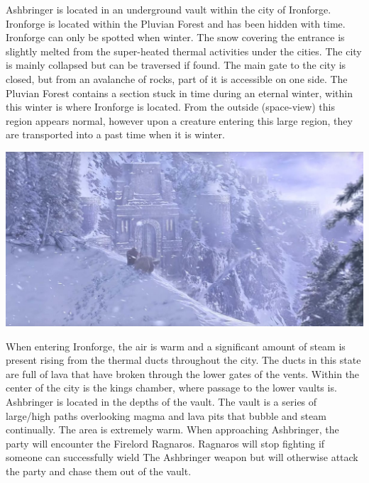 Ashbringer is located in an underground vault within the city of Ironforge. Ironforge is located within the Pluvian Forest and has been hidden with time. Ironforge can only be spotted when winter. The snow covering the entrance is slightly melted from the super-heated thermal activities under the cities. The city is mainly collapsed but can be traversed if found. The main gate to the city is closed, but from an avalanche of rocks, part of it is accessible on one side. The Pluvian Forest contains a section stuck in time during an eternal winter, within this winter is where Ironforge is located. From the outside (space-view) this region appears normal, however upon a creature entering this large region, they are transported into a past time when it is winter. 

\begin{center}
	\includegraphics[width=\linewidth]{img/WoW/1200px-Ironforge_-_Classic_cinematic.jpg}
\end{center}

When entering Ironforge, the air is warm and a significant amount of steam is present rising from the thermal ducts throughout the city. The ducts in this state are full of lava that have broken through the lower gates of the vents. Within the center of the city is the kings chamber, where passage to the lower vaults is. Ashbringer is located in the depths of the vault. The vault is a series of large/high paths overlooking magma and lava pits that bubble and steam continually. The area is extremely warm. When approaching Ashbringer, the party will encounter the Firelord Ragnaros. Ragnaros will stop fighting if someone can successfully wield The Ashbringer weapon but will otherwise attack the party and chase them out of the vault.

